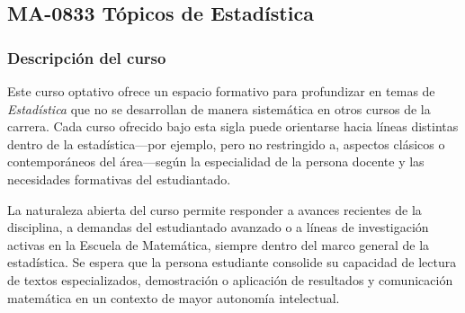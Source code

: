 \newpage
\subsection*{MA-0833 Tópicos de Estadística}

\hypertarget{MA0833}{}
\begin{refsection}
\begin{table}[H]
\end{table}

\subsubsection*{Descripción del curso}

Este curso optativo ofrece un espacio formativo para profundizar en temas de \emph{Estadística} que no se desarrollan de manera sistemática en otros cursos de la carrera. Cada curso ofrecido bajo esta sigla puede orientarse hacia líneas distintas dentro de la estadística---por ejemplo, pero no restringido a, aspectos clásicos o contemporáneos del área---según la especialidad de la persona docente y las necesidades formativas del estudiantado.

La naturaleza abierta del curso permite responder a avances recientes de la disciplina, a demandas del estudiantado avanzado o a líneas de investigación activas en la Escuela de Matemática, siempre dentro del marco general de la estadística. Se espera que la persona estudiante consolide su capacidad de lectura de textos especializados, demostración o aplicación de resultados y comunicación matemática en un contexto de mayor autonomía intelectual.


\end{refsection}
